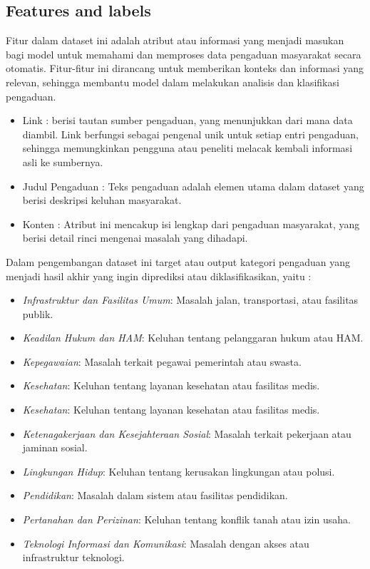\documentclass[12pt,a4paper]{article}
\begin{document}
\subsection{Features and labels}
\begin{adjustwidth}{3em}{0pt} 
\hspace{0.5cm} Fitur dalam dataset ini adalah atribut atau informasi yang menjadi masukan bagi model untuk memahami dan memproses data pengaduan masyarakat secara otomatis. Fitur-fitur ini dirancang untuk memberikan konteks dan informasi yang relevan, sehingga membantu model dalam melakukan analisis dan klasifikasi pengaduan.
\begin{itemize}
    \item Link : berisi tautan sumber pengaduan, yang menunjukkan dari mana data diambil. Link berfungsi sebagai pengenal unik untuk setiap entri pengaduan, sehingga memungkinkan pengguna atau peneliti melacak kembali informasi asli ke sumbernya. 
    \item Judul Pengaduan : Teks pengaduan adalah elemen utama dalam dataset yang berisi deskripsi keluhan masyarakat. 
    \item Konten : Atribut ini mencakup isi lengkap dari pengaduan masyarakat, yang berisi detail rinci mengenai masalah yang dihadapi.
\end{itemize}

\hspace{0.5cm} Dalam pengembangan dataset ini target atau output kategori pengaduan yang menjadi hasil akhir yang ingin diprediksi atau diklasifikasikan, yaitu :

\begin{itemize}
    \item \textit{Infrastruktur dan Fasilitas Umum}: Masalah jalan, transportasi, atau fasilitas publik.
    \item \textit{Keadilan Hukum dan HAM}: Keluhan tentang pelanggaran hukum atau HAM.
    \item \textit{Kepegawaian}: Masalah terkait pegawai pemerintah atau swasta.
    \item \textit{Kesehatan}: Keluhan tentang layanan kesehatan atau fasilitas medis.
    \item \textit{Kesehatan}: Keluhan tentang layanan kesehatan atau fasilitas medis.
    \item \textit{Ketenagakerjaan dan Kesejahteraan Sosial}: Masalah terkait pekerjaan atau jaminan sosial.
    \item \textit{Lingkungan Hidup}: Keluhan tentang kerusakan lingkungan atau polusi.
    \item \textit{Pendidikan}: Masalah dalam sistem atau fasilitas pendidikan.
    \item \textit{Pertanahan dan Perizinan}: Keluhan tentang konflik tanah atau izin usaha.
    \item \textit{Teknologi Informasi dan Komunikasi}: Masalah dengan akses atau infrastruktur teknologi.
\end{itemize}

\end{adjustwidth}
\end{document}

